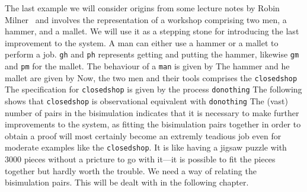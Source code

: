 The last example we will consider origins from some lecture notes by Robin Milner~\cite{Larsen} and involves the representation of a workshop comprising two men, a hammer, and a mallet. We will use it as a stepping stone for introducing the last improvement to the system. A man can either use a hammer or a mallet to perform a job. \verb#gh# and \verb#ph# represents getting and putting the hammer, likewise \verb#gm# and \verb#pm# for the mallet. The behaviour of a \verb#man# is given by
%
The hammer and he mallet are given by
%
Now, the two men and their tools comprises the \verb#closedshop#
%
The specification for \verb#closedshop# is given by the process \verb#donothing#
%
The following shows that \verb#closedshop# is observational equivalent with \verb#donothing#
%
The (vast) number of pairs in the bisimulation indicates that it is necessary to make further improvements to the system, as fitting the bisimulation pairs together in order to obtain a proof will most certainly become an extremly teadious job even for moderate examples like the \verb#closedshop#. It is like having a jigsaw puzzle with 3000 pieces without a pricture to go with it---it is possible to fit the pieces together but hardly worth the trouble. We need a way of relating the bisimulation pairs. This will be dealt with in the following chapter.



